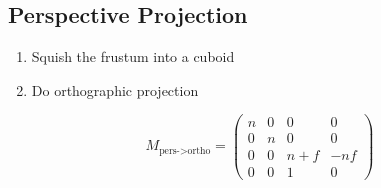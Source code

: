 \subsection{Perspective Projection}

\begin{enumerate}
    \item Squish the frustum into a cuboid
    \item Do orthographic projection
\end{enumerate}

$$M_{\text{pers->ortho}} = \begin{pmatrix}
    n & 0 & 0 & 0 \\
    0 & n & 0 & 0 \\
    0 & 0 & n + f & -nf \\
    0 & 0 & 1 & 0
\end{pmatrix}$$

% 
